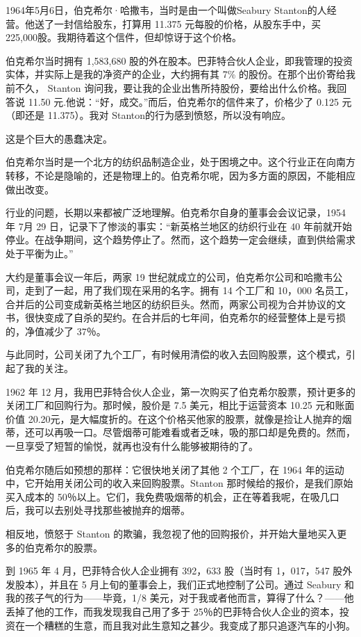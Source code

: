 \documentclass[UTF8,a4paper,zihao=-4,fontset = windows]{ctexart} %
\begin{document}
1964年5月6日，伯克希尔·哈撒韦，当时是由一个叫做Seabury Stanton的人经营。他送了一封信给股东，打算用 11.375 元每股的价格，从股东手中，买 225,000股。我期待着这个信件，但却惊讶于这个价格。

伯克希尔当时拥有 1,583,680 股的外在股本。巴菲特合伙人企业，即我管理的投资实体，并实际上是我的净资产的企业，大约拥有其 7\% 的股份。在那个出价寄给我前不久， Stanton 询问我，要让我的企业出售所持股份，要给出什么价格。我回答说 11.50 元.他说：“好，成交。”而后，伯克希尔的信件来了，价格少了 0.125 元（即还是 11.375）。我对 Stanton的行为感到愤怒，所以没有响应。

这是个巨大的愚蠢决定。

伯克希尔当时是一个北方的纺织品制造企业，处于困境之中。这个行业正在向南方转移，不论是隐喻的，还是物理上的。伯克希尔呢，因为多方面的原因，不能相应做出改变。

行业的问题，长期以来都被广泛地理解。伯克希尔自身的董事会会议记录，1954 年 7月 29 日，记录下了惨淡的事实：“新英格兰地区的纺织行业在 40 年前就开始停业。在战争期间，这个趋势停止了。然而，这个趋势一定会继续，直到供给需求处于平衡为止。”

大约是董事会议一年后，两家 19 世纪就成立的公司，伯克希尔公司和哈撒韦公司，走到了一起，用了我们现在采用的名字。拥有 14 个工厂和 10，000 名员工，合并后的公司变成新英格兰地区的纺织巨头。然而，两家公司视为合并协议的文书，很快变成了自杀的契约。在合并后的七年间，伯克希尔的经营整体上是亏损的，净值减少了 37％。

与此同时，公司关闭了九个工厂，有时候用清偿的收入去回购股票，这个模式，引起了我的关注。

1962 年 12 月，我用巴菲特合伙人企业，第一次购买了伯克希尔股票，预计更多的关闭工厂和回购行为。那时候，股价是 7.5 美元，相比于运营资本 10.25 元和账面价值 20.20元，是大幅度折的。在这个价格买他家的股票，就像是捡让人抛弃的烟蒂，还可以再吸一口。尽管烟蒂可能难看或者乏味，吸的那口却是免费的。然而，一旦享受了短暂的愉悦，就再也没有什么能够被期待的了。

伯克希尔随后如预想的那样：它很快地关闭了其他 2 个工厂，在 1964 年的运动中，它开始用关闭公司的收入来回购股票。Stanton 那时候给的报价，是我们原始买入成本的 50％以上。它们，我免费吸烟蒂的机会，正在等着我呢，在吸几口后，我可以去别处寻找那些被抛弃的烟蒂。

相反地，愤怒于 Stanton 的欺骗，我忽视了他的回购报价，并开始大量地买入更多的伯克希尔的股票。

到 1965 年 4 月，巴菲特合伙人企业拥有 392，633 股（当时有 1，017，547 股外发股本），并且在 5 月上旬的董事会上，我们正式地控制了公司。通过 Seabury 和我的孩子气的行为——毕竟，1/8 美元，对于我或者他而言，算得了什么？——他丢掉了他的工作，而我发现我自己用了多于 25％的巴菲特合伙人企业的资本，投资在一个糟糕的生意，而且我对此生意知之甚少。我变成了那只追逐汽车的小狗。
\end{document}
